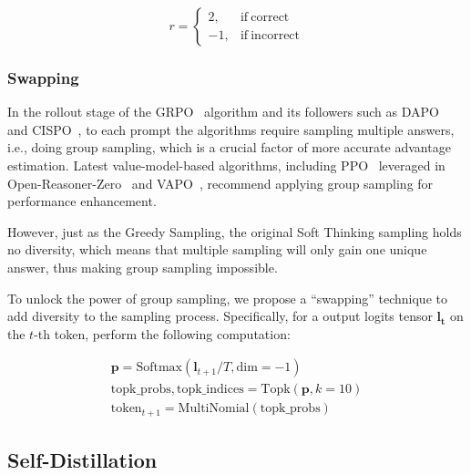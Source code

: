 \begin{equation*}
    r = \begin{cases}
        2, & \mathrm{if\ correct} \\
        -1, & \mathrm{if\ incorrect}
    \end{cases}
\end{equation*}

\subsubsection{Swapping}\label{subsubsec:swapping}

In the rollout stage of the GRPO~\citep{shao2024deepseekmathpushinglimitsmathematical} algorithm and its followers such
as DAPO~\citep{yu2025dapoopensourcellmreinforcement} and CISPO~\citep{minimax2025minimaxm1scalingtesttimecompute},
to each prompt the algorithms require sampling multiple answers, i.e., doing group sampling, which is a crucial factor of
more accurate advantage estimation.
Latest value-model-based algorithms, including PPO~\citep{DBLP:journals/corr/SchulmanWDRK17} leveraged in
Open-Reasoner-Zero~\citep{hu2025openreasonerzeroopensourceapproach} and
VAPO~\citep{yue2025vapoefficientreliablereinforcement}, recommend applying group sampling for performance enhancement.

However, just as the Greedy Sampling, the original Soft Thinking sampling holds no diversity, which means that multiple
sampling will only gain one unique answer, thus making group sampling impossible.

To unlock the power of group sampling, we propose a ``swapping'' technique to add diversity to the sampling process.
Specifically, for a output logits tensor $\boldsymbol{l_{t}}$ on the $t$-th token, perform the following
computation:

\begin{gather*}
    \boldsymbol{p} = \mathrm{Softmax}(\boldsymbol{l}_{t+1} / T, \mathrm{dim}=-1) \\
    \mathrm{topk\_probs}, \mathrm{topk\_indices} =
    \mathrm{Topk}(\boldsymbol{p}, k=10) \\
    \mathrm{token}_{t+1} = \mathrm{MultiNomial}(\mathrm{topk\_probs})
\end{gather*}

\subsection{Self-Distillation}\label{subsec:self-distillation}
